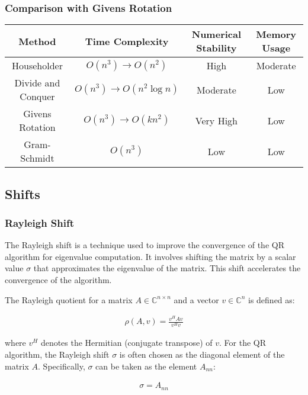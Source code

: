 \documentclass[12pt]{article}
\numberwithin{equation}{subsubsection}
\begin{document}
\subsubsection{Comparison with Givens Rotation}
\begin{tabular}{|c|c|c|c|}
	\hline
	\textbf{Method}    & \textbf{Time Complexity}       & \textbf{Numerical Stability} & \textbf{Memory Usage} \\
	\hline
	Householder        & $ O(n^3)\to O(n^2) $         & High                         & Moderate              \\
	Divide and Conquer & $ O(n^3) \to O(n^2\log{n}) $ & Moderate                     & Low                   \\
	Givens Rotation    & $ O(n^3) \to O(kn^2) $       & Very High                    & Low                   \\
	Gram-Schmidt       & $ O(n^3) $                   & Low                          & Low                   \\
	\hline
\end{tabular}

\subsection{Shifts}

\subsubsection{Rayleigh Shift}
The Rayleigh shift is a technique used to improve the convergence of the QR algorithm for eigenvalue computation. It involves shifting the matrix by a scalar value $ \sigma $ that approximates the eigenvalue of the matrix. This shift accelerates the convergence of the algorithm.

The Rayleigh quotient for a matrix $ A \in \mathbb{C}^{n \times n} $ and a vector $ v \in \mathbb{C}^n $ is defined as:

\begin{align}
	\rho(A, v) = \frac{v^H A v}{v^H v}
\end{align}

where $ v^H $ denotes the Hermitian (conjugate transpose) of $ v $. For the QR algorithm, the Rayleigh shift $ \sigma $ is often chosen as the diagonal element of the matrix $ A $. Specifically, $ \sigma $ can be taken as the element $ A_{nn} $:

\begin{align}
	\sigma = A_{nn}
\end{align}
\end{document}
